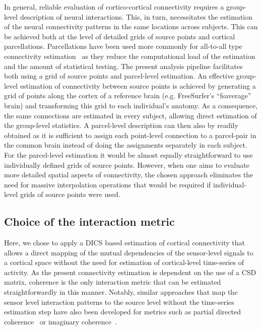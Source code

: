 \documentclass[utf8]{frontiersSCNS}
\renewcommand{\cite}[1]{~\citep{#1}}
\begin{document}
In general, reliable evaluation of cortico-cortical connectivity requires a group-level description of neural interactions.
This, in turn, necessitates the estimation of the neural connectivity patterns in the same locations across subjects.
This can be achieved both at the level of detailed grids of source points and cortical parcellations.
Parcellations have been used more commonly for all-to-all type connectivity estimation\cite{Palva2010, Saarinen2015, Schoffelen2017} as they reduce the computational load of the estimation and the amount of statistical testing.
The present analysis pipeline facilitates both using a grid of source points and parcel-level estimation.  An effective group-level estimation of connectivity between source points is achieved by generating a grid of points along the cortex of a reference brain (e.g. FreeSurfer's ``fsaverage'' brain) and transforming this grid to each individual's anatomy.
As a consequence, the same connections are estimated in every subject, allowing direct estimation of the group-level statistics.
A parcel-level description can then also by readily obtained as it is sufficient to assign each point-level connection to a parcel-pair in the common brain instead of doing the assignments separately in each subject.
For the parcel-level estimation it would be almost equally straightforward to use individually defined grids of source points.
However, when one aims to evaluate more detailed spatial aspects of connectivity, the chosen approach eliminates the need for massive interpolation operations that would be required if individual-level grids of source points were used.

\subsection{Choice of the interaction metric}

Here, we chose to apply a DICS based estimation of cortical connectivity that allows a direct mapping of the mutual dependencies of the sensor-level signals to a cortical space without the need for estimation of cortical-level time-series of activity.
As the present connectivity estimation is dependent on the use of a CSD matrix, coherence is the only interaction metric that can be estimated straightforwardly in this manner.
Notably, similar approaches that map the sensor level interaction patterns to the source level without the time-series estimation step have also been developed for metrics such as partial directed coherence\cite{Michalareas2013} or imaginary coherence\cite{Drakesmith2013}.
\end{document}
